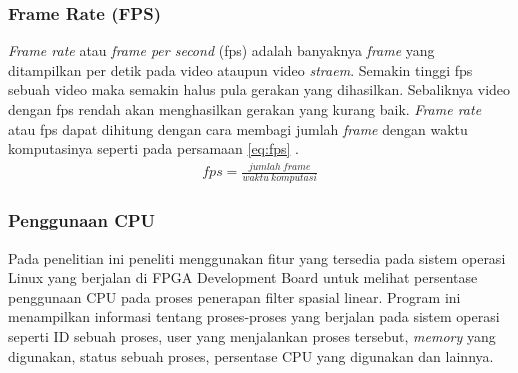 \subsubsection{Frame Rate (FPS)}
\textit{Frame rate} atau \textit{frame per second} (fps) adalah banyaknya \textit{frame} yang ditampilkan per detik pada video ataupun video \textit{straem}. Semakin tinggi fps sebuah video maka semakin halus pula gerakan yang dihasilkan. Sebaliknya video dengan fps rendah akan menghasilkan gerakan yang kurang baik. \textit{Frame rate} atau fps dapat dihitung dengan cara membagi jumlah \textit{frame} dengan waktu komputasinya seperti pada persamaan \ref{eq:fps} \cite{pdf:pavan}.
\begin{equation}
    \label{eq:fps}
    \begin{split}
fps = \frac{jumlah\ frame}{waktu\ komputasi}
    \end{split}
\end{equation}

\subsubsection{Penggunaan CPU}
Pada penelitian ini peneliti menggunakan fitur yang tersedia pada sistem operasi Linux yang berjalan di FPGA Development Board untuk melihat persentase penggunaan CPU pada proses penerapan filter spasial linear. Program ini menampilkan informasi tentang proses-proses yang berjalan pada sistem operasi seperti ID sebuah proses, user yang menjalankan proses tersebut, \textit{memory} yang digunakan, status sebuah proses, persentase CPU yang digunakan dan lainnya.

